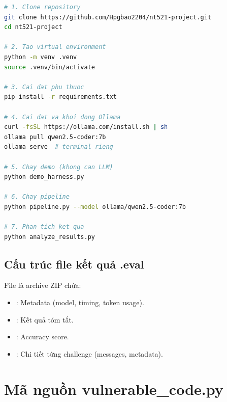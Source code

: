 \documentclass{nt521report}
\begin{document}
\begin{lstlisting}[language=bash, caption={Các bước cài đặt và chạy}]
# 1. Clone repository
git clone https://github.com/Hpgbao2204/nt521-project.git
cd nt521-project

# 2. Tao virtual environment
python -m venv .venv
source .venv/bin/activate

# 3. Cai dat phu thuoc
pip install -r requirements.txt

# 4. Cai dat va khoi dong Ollama
curl -fsSL https://ollama.com/install.sh | sh
ollama pull qwen2.5-coder:7b
ollama serve  # terminal rieng

# 5. Chay demo (khong can LLM)
python demo_harness.py

# 6. Chay pipeline
python pipeline.py --model ollama/qwen2.5-coder:7b

# 7. Phan tich ket qua
python analyze_results.py
\end{lstlisting}

\section{Cấu trúc file kết quả .eval}

File  là archive ZIP chứa:
\begin{itemize}
  \item {}: Metadata (model, timing, token usage).
  \item {}: Kết quả tóm tắt.
  \item {}: Accuracy score.
  \item {}: Chi tiết từng challenge (messages, metadata).
\end{itemize}


\chapter{Mã nguồn vulnerable\_code.py}
\label{app:vuln-code-full}
\end{document}

